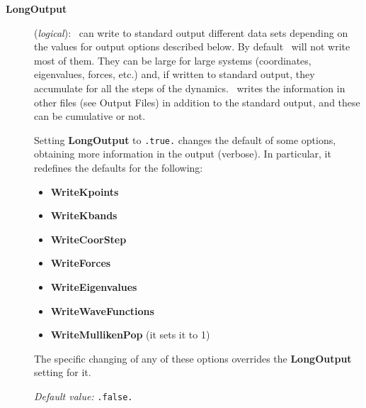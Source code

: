 \begin{description}

\item[\textbf{LongOutput}] (\textit{logical}):
\siesta\ can write to standard output different data sets
depending on the values for output options described below.
By default \siesta\ will not write most of them. They can be
large for large systems (coordinates, eigenvalues, forces, etc.)
and, if written to standard output, they accumulate for all the steps of
the dynamics. \siesta\ writes the information in other files
(see Output Files) in addition to the standard output, and these
can be cumulative or not.

Setting \textbf{LongOutput} to \texttt{.true.} changes the default of
some options, obtaining more information in the output (verbose).
In particular, it redefines the defaults for the following:

\begin{itemize}

\item
\textbf{WriteKpoints}
\item
\textbf{WriteKbands}
\item
\textbf{WriteCoorStep}
\item
\textbf{WriteForces}
\item
\textbf{WriteEigenvalues}
\item
\textbf{WriteWaveFunctions}
\item
\textbf{WriteMullikenPop}
(it sets it to 1)
\end{itemize}

The specific changing of any of these options overrides the
\textbf{LongOutput} setting for it.

\textit{Default value:} \texttt{.false.}

\end{description}

